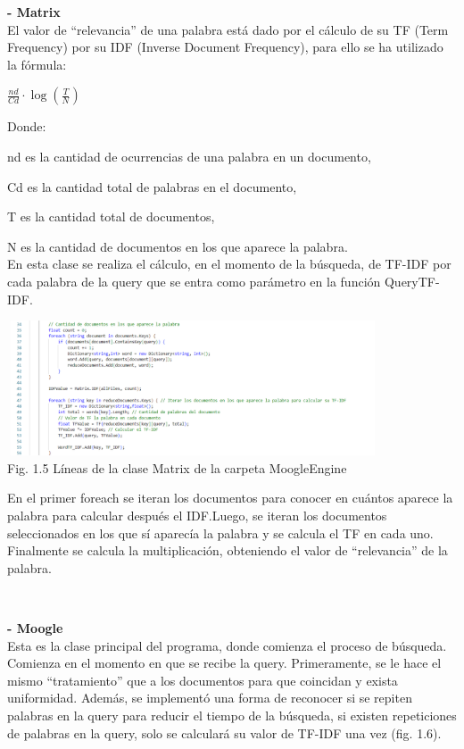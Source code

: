 \documentclass[letterpaper]{article}
\begin{document}
{\textbf{{\large- Matrix}}\\

El valor de “relevancia” de una palabra está dado por el cálculo de su TF (Term Frequency)
por su IDF (Inverse Document Frequency), para ello se ha utilizado la fórmula:
\begin{center}
	$\frac{nd}{Cd} \cdot \log (\frac{T}{N})$ \\
\end{center}

Donde:
\

nd es la cantidad de ocurrencias de una palabra en un documento,

Cd es la cantidad total de palabras en el documento,

T es la cantidad total de documentos,

N es la cantidad de documentos en los que aparece la palabra.\\

En esta clase se realiza el cálculo, en el momento de la búsqueda, de TF-IDF por cada
palabra de la query que se entra como parámetro en la función QueryTF-IDF.

\begin{center}
	\includegraphics[width=11cm, height=4cm]{fig 1.5.png}\\
	{\tiny Fig. 1.5 Líneas de la clase Matrix de la carpeta MoogleEngine}
\end{center}

En el primer foreach se iteran los documentos para conocer en cuántos aparece la
palabra para calcular después el IDF.Luego, se iteran los documentos seleccionados en los que
sí aparecía la palabra y se calcula el TF en cada uno. Finalmente se calcula la multiplicación,
obteniendo el valor de “relevancia” de la palabra.

\

\textbf{{\large- Moogle}}\\

Esta es la clase principal del programa, donde comienza el proceso de búsqueda. Comienza
en el momento en que se recibe la query. Primeramente, se le hace el mismo “tratamiento”
que a los documentos para que coincidan y exista uniformidad. Además, se implementó una
forma de reconocer si se repiten palabras en la query para reducir el tiempo de la búsqueda, si
existen repeticiones de palabras en la query, solo se calculará su valor de TF-IDF una vez (fig.
1.6).

}
\end{document}

